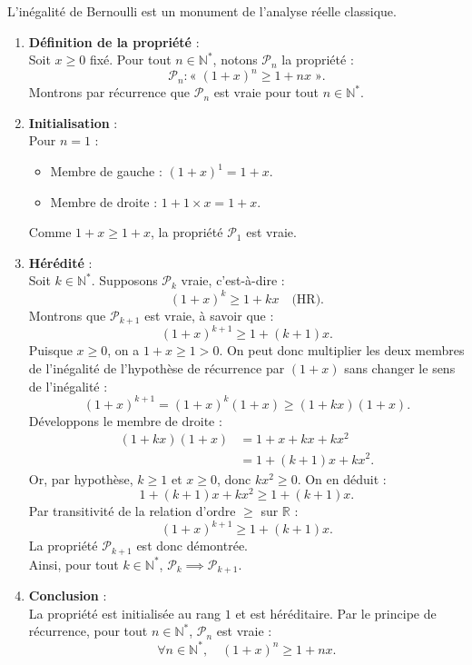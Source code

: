 \documentclass[11pt,a4paper]{article}
\newcommand{\N}{\mathbb{N}}
\newcommand{\R}{\mathbb{R}}
\begin{document}
\begin{correctionbox}
L'inégalité de Bernoulli est un monument de l'analyse réelle classique.

\begin{enumerate}[label=\textbf{\arabic*.}]
    \item \textbf{Définition de la propriété} :\\
    Soit $x \ge 0$ fixé. Pour tout $n \in \N^*$, notons $\mathcal{P}_n$ la propriété :
    \[
    \mathcal{P}_n : « \; (1+x)^n \ge 1 + nx \; ».
    \]
    Montrons par récurrence que $\mathcal{P}_n$ est vraie pour tout $n \in \N^*$.

    \item \textbf{Initialisation} :\\
    Pour $n = 1$ :
    \begin{itemize}
        \item Membre de gauche : $(1+x)^1 = 1+x$.
        \item Membre de droite : $1 + 1 \times x = 1+x$.
    \end{itemize}
    Comme $1+x \ge 1+x$, la propriété $\mathcal{P}_1$ est vraie.

    \item \textbf{Hérédité} :\\
    Soit $k \in \N^*$. Supposons $\mathcal{P}_k$ vraie, c'est-à-dire :
    \[
    (1+x)^k \ge 1 + kx \quad \text{(HR)}.
    \]
    Montrons que $\mathcal{P}_{k+1}$ est vraie, à savoir que :
    \[
    (1+x)^{k+1} \ge 1 + (k+1)x.
    \]
    Puisque $x \ge 0$, on a $1+x \ge 1 > 0$. On peut donc multiplier les deux membres de l'inégalité de l'hypothèse de récurrence par $(1+x)$ sans changer le sens de l'inégalité :
    \[
    (1+x)^{k+1} = (1+x)^k (1+x) \ge (1 + kx)(1 + x).
    \]
    Développons le membre de droite :
    \begin{align*}
    (1 + kx)(1 + x) &= 1 + x + kx + kx^2 \\
                    &= 1 + (k+1)x + kx^2.
    \end{align*}
    Or, par hypothèse, $k \ge 1$ et $x \ge 0$, donc $kx^2 \ge 0$. On en déduit :
    \[
    1 + (k+1)x + kx^2 \ge 1 + (k+1)x.
    \]
    Par transitivité de la relation d'ordre $\ge$ sur $\R$ :
    \[
    (1+x)^{k+1} \ge 1 + (k+1)x.
    \]
    La propriété $\mathcal{P}_{k+1}$ est donc démontrée.\\
    Ainsi, pour tout $k \in \N^*$, $\mathcal{P}_k \implies \mathcal{P}_{k+1}$.

    \item \textbf{Conclusion} :\\
    La propriété est initialisée au rang $1$ et est héréditaire. Par le principe de récurrence, pour tout $n \in \N^*$, $\mathcal{P}_n$ est vraie :
    \[
    \forall n \in \N^*, \quad (1+x)^n \ge 1 + nx.
    \]
\end{enumerate}
\end{correctionbox}
\end{document}
